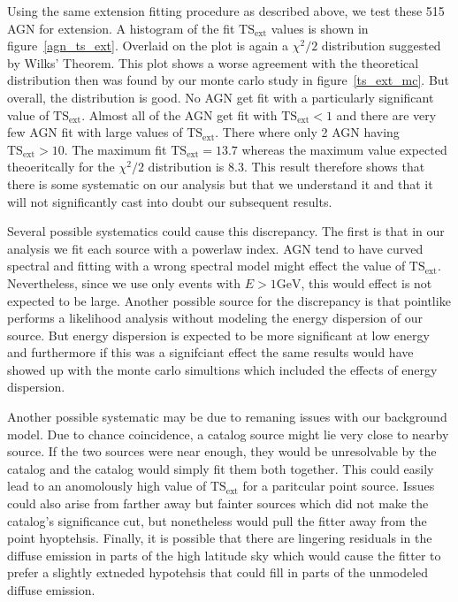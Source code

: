 \documentclass[preprint]{aastex}
\newcommand{\gev}{\text{GeV}\xspace}
\newcommand{\tsext}{{\ensuremath{\text{TS}_\text{ext}}}\xspace}
\begin{document}
Using the same extension fitting procedure as described above, we
test these 515 AGN for extension. A histogram of the fit \tsext values
is shown in figure~\ref{agn_ts_ext}. Overlaid on the plot is again a
$\chi^2/2$ distribution suggested by Wilks' Theorem.  This plot shows
a worse agreement with the theoretical distribution then was found
by our monte carlo study in figure~\ref{ts_ext_mc}.  But overall, the
distribution is good. No AGN get fit with a particularly significant
value of $\tsext$. Almost all of the AGN get fit with $\tsext<1$ and
there are very few AGN fit with large values of \tsext.  There where
only 2 AGN having $\tsext>10$.  The maximum fit $\tsext=13.7$ whereas the
maximum value expected theoeritcally for the $\chi^2/2$ distribution is
8.3. This result therefore shows that there is some systematic on our
analysis but that we understand it and that it will not significantly
cast into doubt our subsequent results.

Several possible systematics could cause this discrepancy. The first
is that in our analysis we fit each source with a powerlaw index.
AGN tend to have curved spectral and fitting with a wrong spectral
model might effect the value of \tsext. Nevertheless, since we use only
events with $E>1\gev$, this would effect is not expected to be large.
Another possible source for the discrepancy is that pointlike performs a
likelihood analysis without modeling the energy dispersion of our source.
But energy dispersion is expected to be more significant at low
energy and furthermore if this was a signifciant effect the same results
would have showed up with the monte carlo simultions which included the
effects of energy dispersion. 

Another possible systematic may be due to remaning issues with our
background model. Due to chance coincidence, a catalog source might
lie very close to nearby source. If the two sources were near enough,
they would be unresolvable by the catalog and the catalog would simply
fit them both together.  This could easily lead to an anomolously high
value of \tsext for a paritcular point source. Issues could also arise
from farther away but fainter sources which did not make the catalog's
significance cut, but nonetheless would pull the fitter away from the
point hyoptehsis.  Finally, it is possible that there are lingering
residuals in the diffuse emission in parts of the high latitude sky
which would cause the fitter to prefer a slightly extneded hypotehsis
that could fill in parts of the unmodeled diffuse emission.
\end{document}
